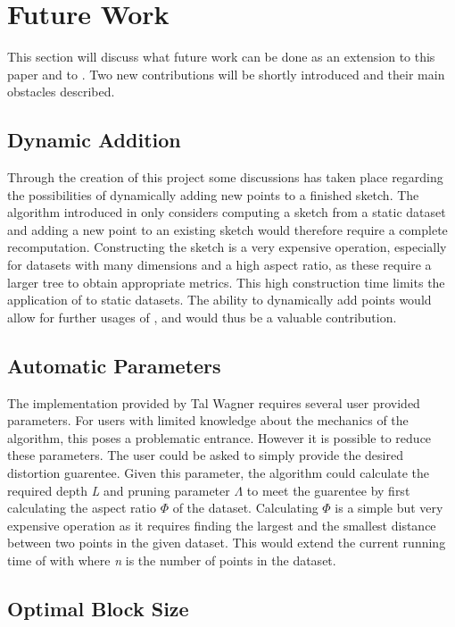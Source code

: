 \section{Future Work}
\label{futurework}
This section will discuss what future work can be done as an extension to this paper and to \cite{wagner17}. Two new contributions will be shortly introduced and their main obstacles described. 

\subsection{Dynamic Addition}
Through the creation of this project some discussions has taken place regarding the possibilities of dynamically adding new points to a finished sketch. The algorithm introduced in \cite{wagner17} only considers computing a sketch from a static dataset and adding a new point to an existing sketch would therefore require a complete recomputation. Constructing the sketch is a very expensive operation, especially for datasets with many dimensions and a high aspect ratio, as these require a larger tree to obtain appropriate metrics. This high construction time limits the application of \qs{} to static datasets. The ability to dynamically add points would allow for further usages of \qs{}, and would thus be a valuable contribution.  

\subsection{Automatic Parameters}
The implementation provided by Tal Wagner requires several user provided parameters. For users with limited knowledge about the mechanics of the algorithm, this poses a problematic entrance. However it is possible to reduce these parameters. The user could be asked to simply provide the desired distortion guarentee. Given this parameter, the algorithm could calculate the required depth \textit{L} and pruning parameter $\Lambda$ to meet the guarentee by first calculating the aspect ratio $\Phi$ of the dataset. Calculating $\Phi$ is a simple but very expensive operation as it requires finding the largest and the smallest distance between two points in the given dataset. This would extend the current running time of \qs{} with  where \textit{n} is the number of points in the dataset. 

\subsection{Optimal Block Size}